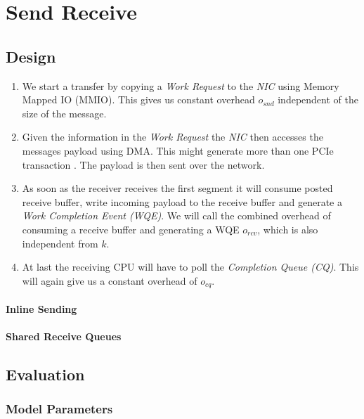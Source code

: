 \section{Send Receive}\label{sendrcv}
\subsection{Design} \label{sendrcv-design}



\begin{enumerate}
  \item We start a transfer by copying a \emph{Work Request} to the \emph{NIC} using Memory Mapped IO (MMIO). This gives
    us constant overhead $o_{snd}$ independent of the size of the message.
  \item Given the information in the \emph{Work Request} the \emph{NIC} then accesses the messages payload using DMA. This 
    might generate more than one PCIe transaction \cite{atc16-kalia}. The payload is then sent over the network.
  \item As soon as the receiver receives the first segment it will consume posted receive buffer, write incoming payload 
    to the receive buffer and generate a \emph{Work Completion Event (WQE)}. We will call the combined overhead of consuming a receive
    buffer and generating a WQE $o_{rcv}$, which is also independent from $k$.
  \item At last the receiving CPU will have to poll the \emph{Completion Queue (CQ)}. This will again give us a constant 
    overhead of $o_{cq}$.
\end{enumerate}

\paragraph{Inline Sending}
\paragraph{Shared Receive Queues}

\subsection{Evaluation}

\subsubsection{Model Parameters}

